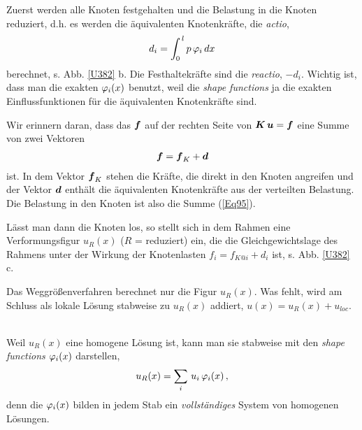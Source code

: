 {{%

Zuerst werden alle Knoten festgehalten und die Belastung in die Knoten reduziert, d.h. es werden die \"{a}quivalenten Knotenkr\"{a}fte, die {\em actio\/},
\begin{align}
d_i = \int_0^{\,l} p\,\varphi_i\,dx
\end{align}
berechnet, s. Abb. \ref{U382} b. Die Festhaltekr\"{a}fte sind die {\em reactio\/}, $- d_i$. Wichtig ist, dass man die exakten $\varphi_i(x)$ benutzt, weil die {\em shape functions\/} ja die exakten Einflussfunktionen f\"{u}r die \"{a}quivalenten Knotenkr\"{a}fte sind.

Wir erinnern daran, dass das $\mbox{\boldmath $f$}$ auf der rechten Seite von $\mbox{\boldmath $K$}\,\mbox{\boldmath $u$} = \mbox{\boldmath $f$}$ eine Summe von zwei Vektoren
\begin{align} \label{Eq95}
\mbox{\boldmath $f$} = \mbox{\boldmath $f$}_K + \mbox{\boldmath $d$}
\end{align}
ist. In dem Vektor $\mbox{\boldmath $f$}_K$ stehen die Kr\"{a}fte, die direkt in den Knoten angreifen und der Vektor $\mbox{\boldmath $d$}$ enth\"{a}lt die \"{a}quivalenten Knotenkr\"{a}fte aus der verteilten Belastung. Die Belastung in den Knoten ist also die Summe (\ref{Eq95}).

L\"{a}sst man dann die Knoten los, so stellt sich in dem Rahmen eine Verformungsfigur $u_R(x)$ ($R$ = reduziert) ein, die die Gleichgewichtslage des Rahmens unter der Wirkung der Knotenlasten $f_i = f_{K @i} + d_i$ ist, s. Abb. \ref{U382} c. \\

\hspace*{-12pt}\colorbox{highlightBlue}{\parbox{0.98\textwidth}{Das Weggr\"{o}{\ss}enverfahren berechnet nur die Figur $u_R(x)$. Was fehlt, wird am Schluss als lokale L\"{o}sung stabweise zu $u_R(x)$ addiert, $u(x) = u_R(x) + u_{loc}$.}}\\

Weil $u_R(x)$ eine homogene L\"{o}sung ist, kann man sie stabweise mit den {\em shape functions\/} $\varphi_i(x)$ darstellen,
\begin{align}
u_R(x) = \sum_i\,u_i\,\varphi_i(x)\,,
\end{align}
denn die $\varphi_i(x)$ bilden in jedem Stab ein {\em vollst\"{a}ndiges\/} System von homogenen L\"{o}sungen.

}}
